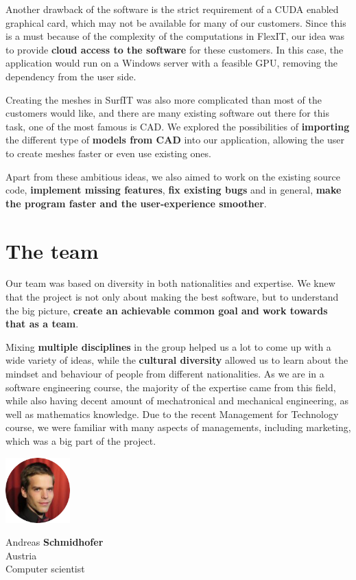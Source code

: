\documentclass[a4paper, 11pt, article]{report}
\begin{document}
Another drawback of the software is the strict requirement of a CUDA enabled graphical card, which may not be available for many of our customers. Since this is a must because of the complexity of the computations in FlexIT, our idea was to provide \textbf{cloud access to the software} for these customers. In this case, the application would run on a Windows server with a feasible GPU, removing the dependency from the user side.

Creating the meshes in SurfIT was also more complicated than most of the customers would like, and there are many existing software out there for this task, one of the most famous is CAD. We explored the possibilities of \textbf{importing} the different type of \textbf{models from CAD} into our application, allowing the user to create meshes faster or even use existing ones.

Apart from these ambitious ideas, we also aimed to work on the existing source code, \textbf{implement missing features}, \textbf{fix existing bugs} and in general, \textbf{make the program faster and the user-experience smoother}.


\section{The team}

Our team was based on diversity in both nationalities and expertise. We knew that the project is not only about making the best software, but to understand the big picture, \textbf{create an achievable common goal and work towards that as a team}. 

Mixing \textbf{multiple disciplines} in the group helped us a lot to come up with a wide variety of ideas, while the \textbf{cultural diversity} allowed us to learn about the mindset and behaviour of people from different nationalities. As we are in a software engineering course, the majority of the expertise came from this field, while also having decent amount of mechatronical and  mechanical engineering, as well as mathematics knowledge. Due to the recent Management for Technology course, we were familiar with many aspects of managements, including marketing, which was a big part of the project. \\[0.3cm]

\newpage 

\begin{minipage}{0.3\textwidth}\raggedleft
\includegraphics[width=2.5cm]{images/andy}
\end{minipage}
\hfill
\begin{minipage}{0.7\textwidth}\center
Andreas \textbf{Schmidhofer} \\   
Austria \\
Computer scientist
\end{minipage} \\[1.5cm]
\end{document}
